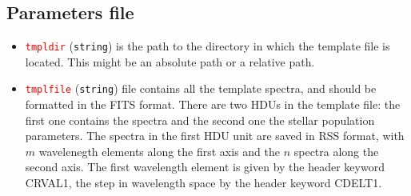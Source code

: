 \documentclass[usenatbib,usegraphicx,useAMS,onecolumn]{mn2e}
\newcommand{\codeline}[1]{\lstinline|#1|}
\newcommand{\paramdef}[1]{\textcolor{red}{\codeline{#1}}}
\begin{document}
\subsection{Parameters file}
\label{subsec:ssp_param}
\begin{itemize}
    \item \paramdef{tmpldir} (\texttt{string}) is the path to the directory in which the template file is located.
        This might be an absolute path or a relative path.
    \item \paramdef{tmplfile} (\texttt{string}) file contains all the template spectra, and should be formatted in the FITS format.
        There are two HDUs in the template file: the first one contains the spectra and the second one the stellar population parameters.
        The spectra in the first HDU unit are saved in RSS format, with $m$ wavelenegth elements along the first axis and the $n$ spectra along the second axis.
        The first wavelength element is given by the header keyword \textsc{CRVAL1}, the step in wavelength space by the header keyword \textsc{CDELT1}.
        

\end{itemize}
\end{document}
